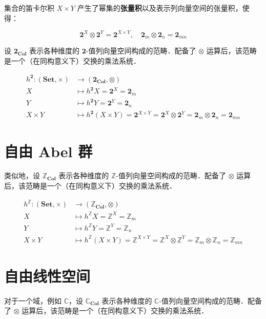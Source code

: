 \documentclass[10pt, openany]{book}
\begin{document}
集合的笛卡尔积 $X \times Y$ 产生了幂集的\textbf{张量积}以及表示列向量空间的张量积，使得：

$$
\mathbf{2}^X \otimes \mathbf{2}^Y = \mathbf{2}^{X \times Y},\quad \mathbf{2}_m \otimes \mathbf{2}_n = \mathbf{2}_{mn}
$$

设 $\mathbf{2}_{\textbf{Col}}$ 表示各种维度的 $\mathbf{2}$-值列向量空间构成的范畴．配备了 $\otimes$ 运算后，该范畴是一个（在同构意义下）交换的乘法系统．

$$
\begin{aligned}
h^{\mathbf{2}}: (\textbf{Set},\times) &\to (\mathbf{2}_{\textbf{Col}},\otimes) \\
X &\mapsto h^{\mathbf{2}} X = \mathbf{2}^X = \mathbf{2}_m \\  
Y &\mapsto h^{\mathbf{2}} Y = \mathbf{2}^Y = \mathbf{2}_n \\ 
X \times Y &\mapsto h^{\mathbf{2}} (X \times Y) = \mathbf{2}^{X \times Y} = \mathbf{2}^X \otimes \mathbf{2}^Y = \mathbf{2}_m \otimes \mathbf{2}_n = \mathbf{2}_{mn}
\end{aligned}
$$

\section{自由 Abel 群}

类似地，设 $\mathbb Z_{\textbf{Col}}$ 表示各种维度的 $\mathbb Z$-值列向量空间构成的范畴．配备了 $\otimes$ 运算后，该范畴是一个（在同构意义下）交换的乘法系统．

$$
\begin{aligned}
h^{\mathbb Z}: (\textbf{Set},\times) &\to (\mathbb Z_{\textbf{Col}},\otimes) \\ 
X &\mapsto h^{\mathbb Z} X = \mathbb Z^X = \mathbb Z_m \\ 
Y &\mapsto h^{\mathbb Z} Y = \mathbb Z^Y = \mathbb Z_n \\  
X \times Y &\mapsto h^{\mathbb Z} (X \times Y) = \mathbb Z^{X \times Y} = \mathbb Z^X \otimes \mathbb Z^Y = \mathbb Z_m \otimes \mathbb Z_n = \mathbb Z_{mn}
\end{aligned}
$$

\section{自由线性空间}

对于一个域，例如 $\mathbb C$，设 $\mathbb C_{\textbf{Col}}$ 表示各种维度的 $\mathbb C$-值列向量空间构成的范畴．配备了 $\otimes$ 运算后，该范畴是一个（在同构意义下）交换的乘法系统．
\end{document}
